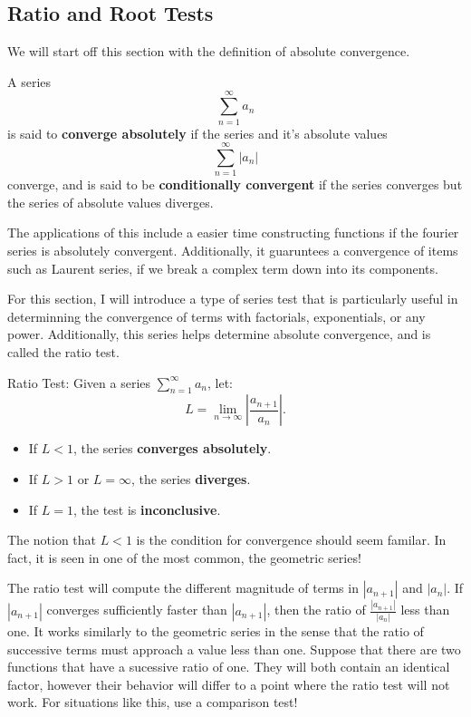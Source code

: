 \documentclass[a4paper, 11pt]{article}
\newenvironment{concept}{%
    \vspace{1em}
    \begin{tcolorbox}[colframe=black!70, colback=white!95, title=Definition]
}{%
    \end{tcolorbox}
    \vspace{1em}
}
\begin{document}
\subsection{Ratio and Root Tests}
We will start off this section with the definition of absolute convergence. 
\begin{concept}
A series \[ \sum_{n=1}^\infty a_n \] is said to \textbf{converge absolutely} if the series and it's absolute values \[ \sum_{n=1}^\infty |a_n| \] converge, and is said to be \textbf{conditionally convergent} if the series converges but the series of absolute values diverges.
\end{concept}
The applications of this include a easier time constructing functions if the fourier series is absolutely convergent. Additionally, it guaruntees a convergence of items such as Laurent series, if we break a complex term down into its components.
\par 
For this section, I will introduce a type of series test that is particularly useful in determinning the convergence of terms with factorials, exponentials, or any power. Additionally, this series helps determine absolute convergence, and is called the ratio test.
\begin{concept}{Ratio Test:}
Given a series \( \sum_{n=1}^\infty a_n \), let:
\[
L = \lim_{n \to \infty} \left| \frac{a_{n+1}}{a_n} \right|.
\]
\begin{itemize}
    \item If \( L < 1 \), the series \textbf{converges absolutely}.
    \item If \( L > 1 \) or \( L = \infty \), the series \textbf{diverges}.
    \item If \( L = 1 \), the test is \textbf{inconclusive}.
\end{itemize}
\end{concept}
The notion that $L < 1$ is the condition for convergence should seem familar. In fact, it is seen in one of the most common, the geometric series! 
\par 
The ratio test will compute the different magnitude of terms in $|a_{n+1}|$ and $|a_n|$. If $|a_{n+1}|$ converges sufficiently faster than $|a_{n+1}|$, then the ratio of $\frac{|a_{n+1}|}{|a_n|}$ less than one. It works similarly to the geometric series in the sense that the ratio of successive terms must approach a value less than one. Suppose that there are two functions that have a sucessive ratio of one. They will both contain an identical factor, however their behavior will differ to a point where the ratio test will not work. For situations like this, use a comparison test! 
\end{document}
